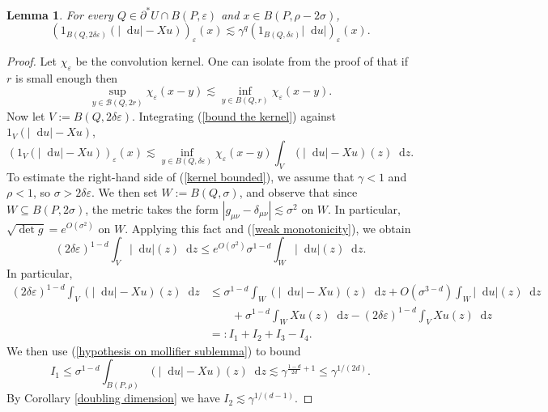 \documentclass[reqno,11pt]{amsart}
\newcommand*\dif{\mathop{}\!\mathrm{d}}
\newtheorem{lemma}[theorem]{Lemma}
\theoremstyle{definition}
\numberwithin{equation}{section}
\begin{document}
\begin{lemma}\label{mollifier sublemma}
For every $Q \in \partial^* U \cap B(P, \varepsilon)$ and $x \in B(P, \rho - 2\sigma)$,
$$(1_{B(Q, 2\delta\varepsilon)}(|\dif u| - Xu))_\varepsilon(x) \lesssim \gamma^q (1_{B(Q, \delta\varepsilon)} |\dif u|)_\varepsilon(x).$$
\end{lemma}
\begin{proof}
Let $\chi_\varepsilon$ be the convolution kernel.
One can isolate from the proof of \cite[Theorem 7.3]{Giusti77} that if $r$ is small enough then
\begin{equation}\label{bound the kernel}
\sup_{y \in \mathcal B(Q, 2r)} \chi_\varepsilon(x - y) \lesssim \inf_{y \in B(Q, r)} \chi_\varepsilon(x - y).
\end{equation}
Now let $V := B(Q, 2\delta\varepsilon)$.
Integrating (\ref{bound the kernel}) against $1_V(|\dif u| - X u)$,
\begin{equation}\label{kernel bounded}
    (1_V(|\dif u| - X u))_\varepsilon(x) \lesssim \inf_{y \in B(Q, \delta\varepsilon)} \chi_\varepsilon(x - y) \int_V (|\dif u| - X u)(z) \dif z.
\end{equation}
To estimate the right-hand side of (\ref{kernel bounded}), we assume that $\gamma < 1$ and $\rho < 1$, so $\sigma > 2\delta\varepsilon$.
We then set $W := B(Q, \sigma)$, and observe that since $W \subseteq B(P, 2\sigma)$, the metric takes the form $|g_{\mu \nu} - \delta_{\mu \nu}| \lesssim \sigma^2$ on $W$.
In particular, $\sqrt{\det g} = e^{O(\sigma^2)}$ on $W$.
Applying this fact and (\ref{weak monotonicity}), we obtain 
$$(2\delta\varepsilon)^{1 - d} \int_V |\dif u|(z) \dif z \leq e^{O(\sigma^2)} \sigma^{1 - d} \int_W |\dif u|(z) \dif z.$$
In particular,
\begin{align*}
(2\delta\varepsilon)^{1 - d} \int_V (|\dif u| - X u)(z) \dif z
&\leq \sigma^{1 - d} \int_W (|\dif u| - X u)(z) \dif z + O(\sigma^{3 - d}) \int_W |\dif u|(z) \dif z \\
&\qquad + \sigma^{1 - d} \int_W X u(z) \dif z - (2\delta\varepsilon)^{1 - d} \int_V Xu(z) \dif z\\
&=: I_1 + I_2 + I_3 - I_4.
\end{align*}
We then use (\ref{hypothesis on mollifier sublemma}) to bound
$$I_1 \leq \sigma^{1 - d} \int_{B(P, \rho)} (|\dif u| - X u)(z) \dif z \lesssim \gamma^{\frac{1 - d}{2d} + 1} \leq \gamma^{1/(2d)}.$$
By Corollary \ref{doubling dimension} we have $I_2 \lesssim \gamma^{1/(d - 1)}$.


\end{proof}
\end{document}
